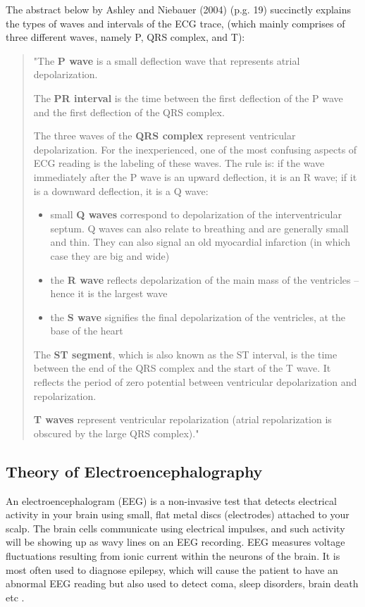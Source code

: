 The abstract below by Ashley and Niebauer (2004) (p.g. 19) \cite{ashley2004conquering} succinctly explains the types of waves and intervals of the ECG trace, (which mainly comprises of three different waves, namely P, QRS complex, and T): 

\blockquote{
"The {\bf P wave} is a small deflection wave that represents atrial depolarization. 

The {\bf PR interval} is the time between the first deflection of the P wave and the first deflection of the QRS complex. 

The three waves of the {\bf QRS complex} represent ventricular depolarization. For the inexperienced, one of the most confusing aspects of ECG reading is the labeling of these waves. The rule is: if the wave immediately after the P wave is an upward deflection, it is an R wave; if it is a downward deflection, it is a Q wave:

\begin{itemize}
	\item small {\bf Q waves} correspond to depolarization of the interventricular septum. Q waves can also relate to breathing and are generally small and thin. They can also signal an old myocardial infarction (in which case they are big and wide)
	\item the {\bf R wave} reflects depolarization of the main mass of the ventricles – hence it is the largest wave
	\item the {\bf S wave} signifies the final depolarization of the ventricles, at the base of the heart 
\end{itemize}

The {\bf ST segment}, which is also known as the ST interval, is the time between the end of the QRS complex and the start of the T wave. It reflects the period of zero potential between ventricular depolarization and repolarization. 

{\bf T waves} represent ventricular repolarization (atrial repolarization is obscured by the large QRS complex)." }


\subsection{Theory of Electroencephalography}

An electroencephalogram (EEG) is a non-invasive test that detects electrical activity in your brain using small, flat metal discs (electrodes) attached to your scalp. The brain cells communicate using electrical impulses, and such activity will be showing up as wavy lines on an EEG recording. EEG measures voltage fluctuations resulting from ionic current within the neurons of the brain. It is most often used to diagnose epilepsy, which will cause the patient to have an abnormal EEG reading but also used to detect coma, sleep disorders, brain death etc \cite{jiahui1}.  

